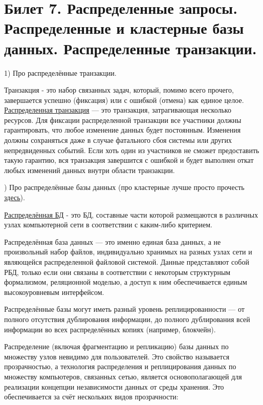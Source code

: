 \newpage
\section {Билет 7. Распределенные запросы. Распределенные и кластерные базы данных. Распределенные транзакции.}

1) Про распределённые транзакции.

Транзакция - это набор связанных задач, который, помимо всего прочего, завершается успешно (фиксация) или с ошибкой (отмена) как единое целое. \href{https://docs.microsoft.com/ru-ru/dotnet/framework/data/adonet/distributed-transactions}{Распределенная транзакция} — это транзакция, затрагивающая несколько ресурсов. Для фиксации распределенной транзакции все участники должны гарантировать, что любое изменение данных будет постоянным. Изменения должны сохраняться даже в случае фатального сбоя системы или других непредвиденных событий. Если хоть один из участников не сможет предоставить такую гарантию, вся транзакция завершится с ошибкой и будет выполнен откат любых изменений данных внутри области транзакции.

) Про распределённые базы данных (про кластерные лучше просто прочесть \href{https://www.jetinfo.ru/klasternye/#gl_2_1}{здесь}).

\href{https://ru.wikipedia.org/wiki/%D0%A0%D0%B0%D1%81%D0%BF%D1%80%D0%B5%D0%B4%D0%B5%D0%BB%D1%91%D0%BD%D0%BD%D0%B0%D1%8F_%D0%B1%D0%B0%D0%B7%D0%B0_%D0%B4%D0%B0%D0%BD%D0%BD%D1%8B%D1%85}{Распределённая БД} - это БД, составные части которой размещаются в различных узлах компьютерной сети в соответствии с каким-либо критерием.

Распределённая база данных — это именно единая база данных, а не произвольный набор файлов, индивидуально хранимых на разных узлах сети и являющейся распределенной файловой системой. Данные представляют собой РБД, только если они связаны в соответствии с некоторым структурным формализмом, реляционной моделью, а доступ к ним обеспечивается единым высокоуровневым интерфейсом.

Распределённые базы могут иметь разный уровень реплицированности — от полного отсутствия дублирования информации, до полного дублирования всей информации во всех распределённых копиях (например, блокчейн).

Распределение (включая фрагментацию и репликацию) базы данных по множеству узлов невидимо для пользователей. Это свойство называется прозрачностью, а технология распределения и реплицирования данных по множеству компьютеров, связанных сетью, является основополагающей для реализации концепции независимости данных от среды хранения. Это обеспечивается за счёт нескольких видов прозрачности:


